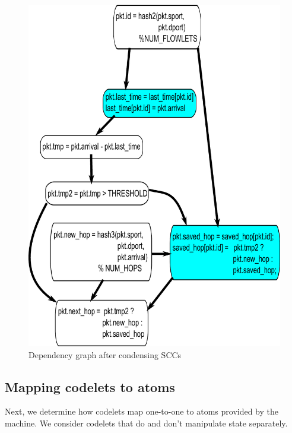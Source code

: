 \begin{figure}[!t]
\begin{minipage}{0.5\textwidth}
\includegraphics[width=\columnwidth]{scc.pdf}
\caption{Dependency graph after condensing SCCs}
\label{fig:partitioning_after}
\end{minipage}
\end{figure}

\subsection{Mapping codelets to atoms}
\label{ss:code_gen}
Next, we determine how codelets map one-to-one to atoms provided by the
\absmachine machine. We consider codelets that do and don't manipulate state
separately.

